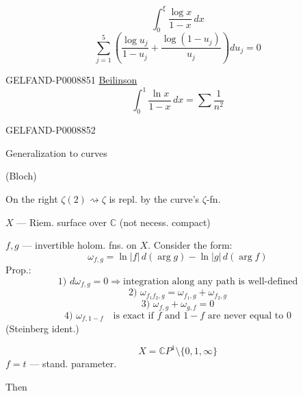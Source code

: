 \begin{equation*}
\int_0^\xi\frac{\log x}{1-x}\,dx
\tag{1}
\end{equation*}
\begin{equation*}
\sum_{j=1}^{5}\left(\frac{\log u_j}{1-u_j}+\frac{\log(1-u_j)}{u_j}\right)du_j=0
\tag{2}
\end{equation*}


\begin{GelfandAdjacentEvidence}{GELFAND-P000885}{1}
\uline{Beilinson}
\begin{equation*}
\int_0^1\frac{\ln x}{1-x}\,dx=\sum\frac{1}{n^2}
\tag{3}
\end{equation*}
\end{GelfandAdjacentEvidence}
\begin{GelfandAdjacentEvidence}{GELFAND-P000885}{2}


Generalization to curves

(Bloch)

On the right $\zeta(2)\rightsquigarrow\zeta$ is repl. by the curve's $\zeta$-fn.

$X$ --- Riem. surface over $\mathbb C$ (not necess. compact)

$f,g$ --- invertible holom. fns. on $X$. Consider the form:
\begin{equation*}
\omega_{f,g}=\ln|f|\,d(\arg g)-\ln|g|\,d(\arg f)
\tag{4}
\end{equation*}
Prop.:
\begin{equation*}
\text{1) }d\omega_{f,g}=0\Rightarrow\text{integration along any path is well-defined}
\tag{5}
\end{equation*}
\begin{equation*}
\text{2) }\omega_{f_1f_2,g}=\omega_{f_1,g}+\omega_{f_2,g}
\tag{6}
\end{equation*}
\begin{equation*}
\text{3) }\omega_{f,g}+\omega_{g,f}=0
\tag{7}
\end{equation*}
\begin{equation*}
\text{4) }\omega_{f,1-f}\quad\text{is exact if }f\text{ and }1-f\text{ are never equal to }0
\tag{8}
\end{equation*}
(Steinberg ident.)

\begin{equation*}
X=\mathbb C P^1\setminus\{0,1,\infty\}
\end{equation*}
$f=t$ --- stand. parameter.

Then

\end{GelfandAdjacentEvidence}
